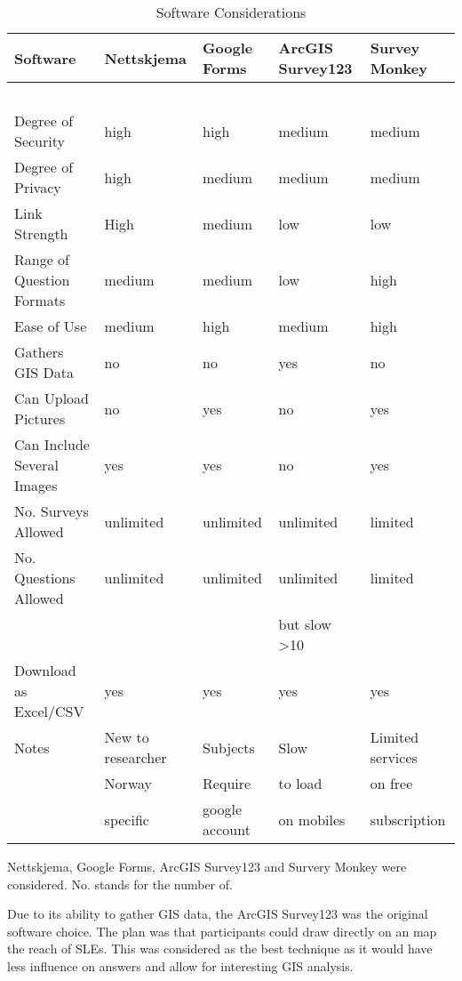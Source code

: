 \begin{table}[h]
    \centering
    \begin{tabular}{|l|l|l|l|l|}
    \hline
        \textbf{Software} & \textbf{Nettskjema} & \textbf{Google Forms} & \textbf{ArcGIS Survey123} & \textbf{Survey Monkey} \\ \hline
        ~ & ~ & ~ & ~ & ~ \\ \hline
        Degree of Security & high & high & medium & medium \\ \hline
        Degree of Privacy & high & medium & medium & medium \\ \hline
        Link Strength & High & medium & low & low \\ \hline
        Range of Question Formats & medium & medium & low & high \\ \hline
        Ease of Use & medium & high & medium & high \\ \hline
        Gathers GIS Data & no & no & yes & no \\ \hline
        Can Upload Pictures & no & yes & no & yes \\ \hline
        Can Include Several Images & yes & yes & no & yes \\ \hline
        No. Surveys Allowed & unlimited & unlimited & unlimited & limited \\ \hline
        No. Questions Allowed & unlimited & unlimited & unlimited & limited \\ \newline
        &  &  &  but slow >10 &  \\ \hline
        Download as Excel/CSV & yes & yes & yes & yes \\ \hline
        Notes & New to researcher & Subjects  & Slow  & Limited services\\ \newline
         & Norway & Require  & to load  & on free \\ \newline
         & specific & google account & on mobiles & subscription \\ \hline
    \end{tabular}
    \caption{Software Considerations}{Nettskjema, Google Forms, ArcGIS Survey123 and Survery Monkey were considered. No. stands for the number of. }
    \label{table: software-considerations}
\end{table}

Due to its ability to gather GIS data, the ArcGIS Survey123 was the original software choice. The plan was that participants could draw directly on an map the reach of SLEs. This was considered as the best technique as it would have less influence on answers and allow for interesting GIS analysis. 
